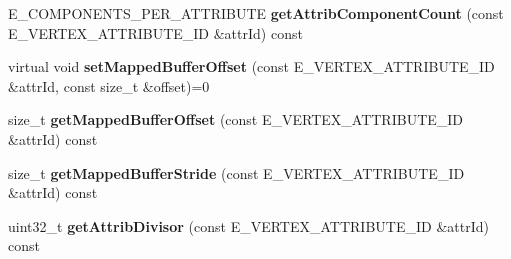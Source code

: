 \begin{DoxyCompactItemize}
\item 
E\+\_\+\+C\+O\+M\+P\+O\+N\+E\+N\+T\+S\+\_\+\+P\+E\+R\+\_\+\+A\+T\+T\+R\+I\+B\+U\+TE {\bfseries get\+Attrib\+Component\+Count} (const E\+\_\+\+V\+E\+R\+T\+E\+X\+\_\+\+A\+T\+T\+R\+I\+B\+U\+T\+E\+\_\+\+ID \&attr\+Id) const \hypertarget{classirr_1_1scene_1_1IMeshDataFormatDesc_ae7a9a0b275926e5b6a3788688beb1cd2}{}\label{classirr_1_1scene_1_1IMeshDataFormatDesc_ae7a9a0b275926e5b6a3788688beb1cd2}

\item 
virtual void {\bfseries set\+Mapped\+Buffer\+Offset} (const E\+\_\+\+V\+E\+R\+T\+E\+X\+\_\+\+A\+T\+T\+R\+I\+B\+U\+T\+E\+\_\+\+ID \&attr\+Id, const size\+\_\+t \&offset)=0\hypertarget{classirr_1_1scene_1_1IMeshDataFormatDesc_a38cc39383b3d46752a338244caaa537d}{}\label{classirr_1_1scene_1_1IMeshDataFormatDesc_a38cc39383b3d46752a338244caaa537d}

\item 
size\+\_\+t {\bfseries get\+Mapped\+Buffer\+Offset} (const E\+\_\+\+V\+E\+R\+T\+E\+X\+\_\+\+A\+T\+T\+R\+I\+B\+U\+T\+E\+\_\+\+ID \&attr\+Id) const \hypertarget{classirr_1_1scene_1_1IMeshDataFormatDesc_aa8e96e7b7fbc292d5b66b735f48fcdd7}{}\label{classirr_1_1scene_1_1IMeshDataFormatDesc_aa8e96e7b7fbc292d5b66b735f48fcdd7}

\item 
size\+\_\+t {\bfseries get\+Mapped\+Buffer\+Stride} (const E\+\_\+\+V\+E\+R\+T\+E\+X\+\_\+\+A\+T\+T\+R\+I\+B\+U\+T\+E\+\_\+\+ID \&attr\+Id) const \hypertarget{classirr_1_1scene_1_1IMeshDataFormatDesc_a4b5ca31ff9ba87b2d49e0cd4f2256db6}{}\label{classirr_1_1scene_1_1IMeshDataFormatDesc_a4b5ca31ff9ba87b2d49e0cd4f2256db6}

\item 
uint32\+\_\+t {\bfseries get\+Attrib\+Divisor} (const E\+\_\+\+V\+E\+R\+T\+E\+X\+\_\+\+A\+T\+T\+R\+I\+B\+U\+T\+E\+\_\+\+ID \&attr\+Id) const \hypertarget{classirr_1_1scene_1_1IMeshDataFormatDesc_a4ef356e8ac1bb3dc4f34e0badabae787}{}\label{classirr_1_1scene_1_1IMeshDataFormatDesc_a4ef356e8ac1bb3dc4f34e0badabae787}

\end{DoxyCompactItemize}
